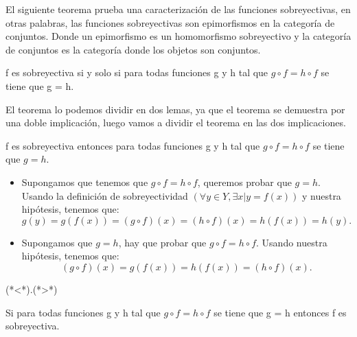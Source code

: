 %
\begin{isabellebody}%
%
%
\isadelimtheory
%
\endisadelimtheory
%
\isatagtheory
%
\endisatagtheory
{\isafoldtheory}%
%
\isadelimtheory
%
\endisadelimtheory
%
\isadelimdocument
%
\endisadelimdocument
%
\isatagdocument
%
\isamarkuptrue%
%
\endisatagdocument
{\isafolddocument}%
%
\isadelimdocument
%
\endisadelimdocument
%
\begin{isamarkuptext}%
El siguiente teorema prueba una caracterización de las funciones
 sobreyectivas, en otras palabras, las funciones sobreyectivas son
 epimorfismos en la categoría de conjuntos. Donde un epimorfismo es un
 homomorfismo sobreyectivo y la categoría de conjuntos es la categoría
 donde los objetos son conjuntos.


\begin {teorema}
  f es sobreyectiva si y solo si  para todas funciones g y h tal que 
$g \circ f  = h \circ f$ se tiene que g = h.
\end {teorema}
 
El teorema lo podemos dividir en dos lemas, ya que el teorema se
 demuestra por una doble implicación, luego vamos a dividir el teorema
 en las dos implicaciones.

\begin {lema}
  f es sobreyectiva entonces  para todas funciones g y h tal que 
$g \circ f = h \circ f$ se tiene que $g = h$.
\end {lema}
\begin {demostracion}
\begin {itemize}
\item Supongamos que tenemos que $g \circ  f = h \circ f$, queremos
 probar que $g = h.$ Usando la definición de sobreyectividad
 $(\forall y \in Y,  \exists x | y = f(x))$ y nuestra hipótesis,
 tenemos que: $$g(y) = g(f(x)) = (g \circ f) (x) = (h \circ f) (x) =
 h(f(x)) = h(y).$$
\item Supongamos que $g = h$, hay que probar que
 $g \circ f = h \circ f.$ Usando nuestra hipótesis, tenemos que:
$$ (g \circ f)(x) = g(f(x)) = h(f(x)) = (h \circ f) (x).$$
\end {itemize}
(*<*).(*>*)
\end {demostracion}

\begin {lema}
 Si  para todas funciones g y h tal que $g \circ f  = h \circ f$ se 
tiene que g = h entonces f es sobreyectiva.
\end {lema}


\end{isamarkuptext}
\end{isabellebody}
